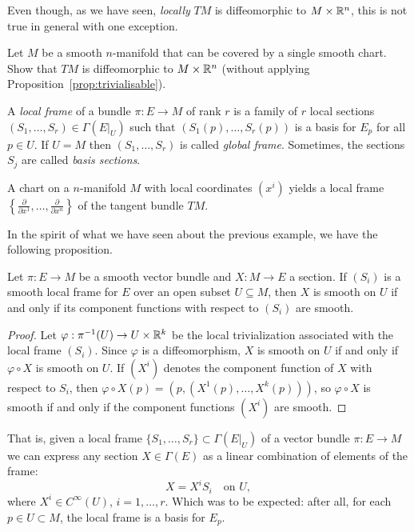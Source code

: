 Even though, as we have seen, \emph{locally} $TM$ is diffeomorphic to $M\times\mathbb{R}^n$, this is not true in general with one exception.
\begin{exercise}\label{ex:trivialisable}
  Let $M$ be a smooth $n$-manifold that can be covered by a single smooth chart.
  Show that $TM$ is diffeomorphic to $M\times\mathbb{R}^n$ (without applying Proposition~\ref{prop:trivialisable}).
\end{exercise}

\begin{definition}
  A \emph{local frame} of a bundle $\pi:E\to M$ of rank $r$ is a family of $r$ local sections $(S_1, \ldots, S_r)\in\Gamma(E|_U)$ such that $(S_1(p), \ldots, S_r(p))$ is a basis for $E_p$ for all $p\in U$.
  If $U=M$ then $(S_1, \ldots, S_r)$ is called \emph{global frame}.
  Sometimes, the sections $S_j$ are called \emph{basis sections}.
\end{definition}

\begin{example}
  A chart on a $n$-manifold $M$ with local coordinates $(x^i)$ yields a local frame $\left\{\frac{\partial}{\partial x^1}, \ldots, \frac{\partial}{\partial x^n}\right\}$ of the tangent bundle $TM$.
\end{example}

In the spirit of what we have seen about the previous example, we have the following proposition.

\begin{proposition}
  Let $\pi:E \to M$ be a smooth vector bundle and $X:M\to E$ a section.
  If $(S_i)$ is a smooth local frame for $E$ over an open subset $U\subseteq M$, then $X$ is smooth on $U$ if and only if its component functions with respect to $(S_i)$ are smooth.
\end{proposition}
\begin{proof}
   Let $\varphi:\pi^{-1}(U) \to U\times\mathbb{R}^k$ be the local trivialization associated with the local frame $(S_i)$. Since $\varphi$ is a diffeomorphism, $X$ is smooth on $U$ if and only if $\varphi\circ X$ is smooth on $U$. If $(X^i)$ denotes the component function of $X$ with respect to $S_i$, then $\varphi\circ X (p) = (p, (X^1(p), \ldots, X^k(p)))$, so $\varphi\circ X$ is smooth if and only if the component functions $(X^i)$ are smooth.
\end{proof}

That is, given a local frame $\{S_1, \ldots, S_r\}\subset\Gamma(E|_U)$ of a vector bundle $\pi: E \to M$ we can express any section $X\in\Gamma(E)$ as a linear combination of elements of the frame:
\begin{equation}
  X = X^i S_i \quad\mbox{on }U,
\end{equation}
where $X^i\in C^\infty(U)$, $i=1,\ldots,r$.
Which was to be expected: after all, for each $p\in U\subset M$, the local frame is a basis for $E_p$.

